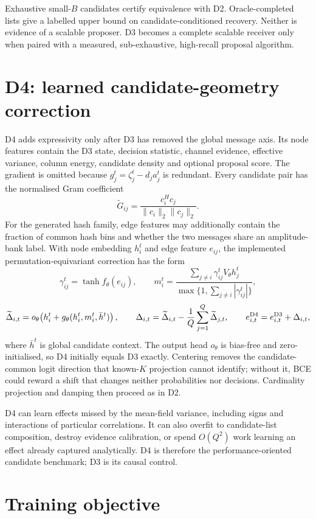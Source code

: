 \documentclass[11pt]{article}
\begin{document}
Exhaustive small-$B$ candidates certify equivalence with D2. Oracle-completed lists give a labelled upper bound on
candidate-conditioned recovery. Neither is evidence of a scalable proposer. D3 becomes a complete scalable receiver
only when paired with a measured, sub-exhaustive, high-recall proposal algorithm.

\section{D4: learned candidate-geometry correction}

D4 adds expressivity only after D3 has removed the global message axis. Its node features contain the D3 state,
decision statistic, channel evidence, effective variance, column energy, candidate density and optional proposal score.
The gradient is omitted because $g_j^t=\zeta_j^t-d_ja_j^t$ is redundant. Every candidate pair has the normalised Gram coefficient
\[
 \widetilde G_{ij}=\frac{c_i^Hc_j}{\|c_i\|_2\|c_j\|_2}.
\]
For the generated hash family, edge features may additionally contain the fraction of common hash bins and whether the
two messages share an amplitude-bank label. With node embedding $h_i^t$ and edge feature $e_{ij}$, the implemented
permutation-equivariant correction has the form
\[
 \gamma_{ij}^t=\tanh f_\theta(e_{ij}),
 \qquad
 m_i^t=\frac{\sum_{j\ne i}\gamma_{ij}^tV_\theta h_j^t}
 {\max\{1,\sum_{j\ne i}|\gamma_{ij}^t|\}},
\]
\[
 \widetilde\Delta_{i,t}=o_\theta\!\left(h_i^t+g_\theta(h_i^t,m_i^t,\bar h^t)\right),
 \qquad
 \Delta_{i,t}=\widetilde\Delta_{i,t}-\frac1Q\sum_{j=1}^Q\widetilde\Delta_{j,t},
 \qquad
 e_{i,t}^{\rm D4}=e_{i,t}^{\rm D3}+\Delta_{i,t},
\]
where $\bar h^t$ is global candidate context. The output head $o_\theta$ is bias-free and zero-initialised, so D4
initially equals D3 exactly. Centering removes the candidate-common logit direction that known-$K$ projection cannot
identify; without it, BCE could reward a shift that changes neither probabilities nor decisions. Cardinality projection
and damping then proceed as in D2.

D4 can learn effects missed by the mean-field variance, including signs and interactions of particular correlations.
It can also overfit to candidate-list composition, destroy evidence calibration, or spend $O(Q^2)$ work learning an
effect already captured analytically. D4 is therefore the performance-oriented candidate benchmark; D3 is its causal
control.

\section{Training objective}
\end{document}

